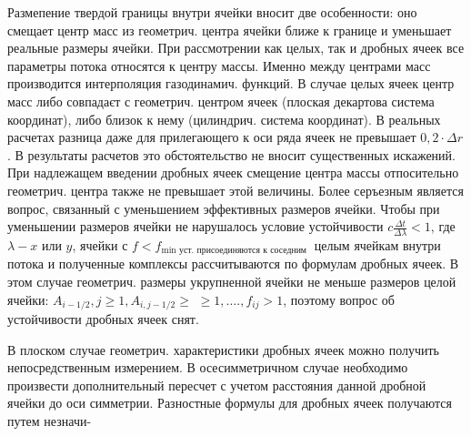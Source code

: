 \documentclass[10pt]{article}
\begin{document}
Размепение твердой границы внутри ячейки вносит две особенности: оно смещает центр масс из геометрич. центра ячейки ближе к границе и уменьшает реальные размеры ячейки. При рассмотрении как целых, так и дробных ячеек все параметры потока относятся к центру массы. Именно между центрами масс производится интерполяция газодинамич. функций. В случае целых ячеек центр масс либо совпадаєт с геометрич. центром ячеек (плоская декартова система координат), либо близок к нему (цилиндрич. система координат). В реальных расчетах разница даже для прилегающего к оси ряда ячеек не превышает $0,2 \cdot \Delta r$. В результаты расчетов это обстоятельство не вносит существенных искажений. При надлежащем введении дробных ячеек смещение центра массы отпосительно геометрич. центра также не превышает этой величины. Более серъезным является вопрос, связанный с уменьшением эффективных размеров ячейки. Чтобы при уменьшении размеров ячейки не нарушалось условие устойчивости $c \frac{\Delta t}{\Delta \lambda}<1$, где $\lambda-x$ или $y$, ячейки с $f<f_{\min \text { уст. присоединяются к соседним }}$ целым ячейкам внутри потока и полученные комплексы рассчитываются по формулам дробных ячеек. В этом случае геометрич. размеры укрупненной ячейки не меньше размеров целой ячейки: $A_{i-1 / 2}, j \geqslant 1, A_{i, j-1 / 2} \geqslant$ $\geqslant 1, \ldots ., f_{i j}>1$, поэтому вопрос об устойчивости дробных ячеек снят.



В плоском случае геометрич. характеристики дробных ячеек можно получить непосредственным измерением. В осесимметричном случае необходимо произвести дополнительный пересчет с учетом расстояния данной дробной ячейки до оси симметрии. Разностные формулы для дробных ячеек получаются путем незначи-
\end{document}
